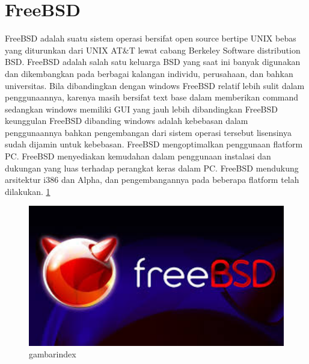 ﻿%
\section{FreeBSD}
	FreeBSD adalah suatu sistem operasi bersifat open source bertipe UNIX bebas yang diturunkan dari UNIX AT\&T lewat cabang Berkeley Software distribution
	BSD. FreeBSD adalah salah satu keluarga BSD yang saat ini banyak digunakan dan dikembangkan pada berbagai kalangan individu,
	perusahaan, dan bahkan universitas. Bila dibandingkan dengan windows FreeBSD relatif lebih sulit dalam penggunaannya, karenya masih bersifat text base
	dalam memberikan command sedangkan windows memiliki GUI yang jauh lebih dibandingkan FreeBSD keunggulan FreeBSD dibanding windows
	adalah kebebasan dalam penggunaannya bahkan pengembangan dari sistem operasi tersebut lisensinya sudah dijamin untuk kebebasan.
	FreeBSD mengoptimalkan penggunaan flatform PC. FreeBSD menyediakan kemudahan dalam penggunaan instalasi dan dukungan yang luas terhadap perangkat keras dalam PC.
	FreeBSD mendukung arsitektur i386 dan Alpha, dan pengembangannya pada beberapa flatform telah dilakukan.
	\ref{index} 
	\begin{figure} [ht]
	\centerline{\includegraphics[width=1\textwidth]{figures/index.jpg}}
	\caption{gambarindex}
	\label {index}
	\end {figure}
